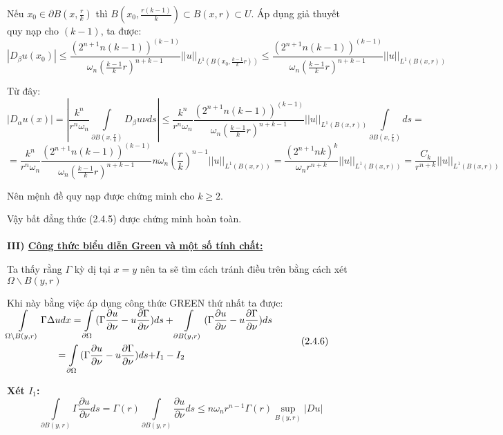 Nếu $x_0  \in \partial B(x,\frac{r}{k})$ thì $B(x_0 ,\frac{{r(k - 1)}}{k}) \subset B(x,r) \subset U$. Áp dụng giả thuyết quy nạp cho $(k-1)$, ta được:
\[
|D_\beta  u(x_0 )| \le \frac{{(2^{n + 1} n(k - 1))^{(k - 1)} }}{{\omega _n (\frac{{k - 1}}{k}r)^{n + k - 1} }}||u||_{L^1 (B(x_0 ,\frac{{k - 1}}{k}r))}  \le \frac{{(2^{n + 1} n(k - 1))^{(k - 1)} }}{{\omega _n (\frac{{k - 1}}{k}r)^{n + k - 1} }}||u||_{L^1 (B(x,r))} 
\]

Từ đây:
\[
|D_\alpha  u(x)| = |\frac{{k^n }}{{r^n \omega _n }}\int\limits_{\partial B(x,\frac{r}{k})} {D_\beta  u\nu ds} | \le \frac{{k^n }}{{r^n \omega _n }}\frac{{(2^{n + 1} n(k - 1))^{(k - 1)} }}{{\omega _n (\frac{{k - 1}}{k}r)^{n + k - 1} }}||u||_{L^1 (B(x ,r))} \int\limits_{\partial B(x,\frac{r}{k})} {ds}= 
\]
\[
 = \frac{{k^n }}{{r^n \omega _n }}\frac{{(2^{n + 1} n(k - 1))^{(k - 1)} }}{{\omega _n (\frac{{k - 1}}{k}r)^{n + k - 1} }}n\omega _n \left( {\frac{r}{k}} \right)^{n - 1} ||u||_{L^1 (B(x,r))}  = \frac{{(2^{n + 1} nk)^k }}{{\omega _n r^{n + k} }}||u||_{L^1 (B(x,r))}  = \frac{{C_k }}{{r^{n + k} }}||u||_{L^1 (B(x,r))} 
 \]

Nên mệnh đề quy nạp được chứng minh cho $k \geq 2$.

Vậy bất đẳng thức (2.4.5) được chứng minh hoàn toàn.
\\
\\
\textbf{III) \underline{Công thức biểu diễn Green và một số tính chất:}}

Ta thấy rằng $\Gamma$ kỳ dị tại $x=y$ nên ta sẽ tìm cách tránh điều trên bằng cách xét $\Omega \backslash B(y,r)$

Khi này bằng việc áp dụng công thức GREEN thứ nhất ta được:\\
$
\begin{gathered}
  \int\limits_{\Omega \backslash B(y,r)} {\Gamma \Delta udx = \int\limits_{\partial \Omega } {(\Gamma \frac{{\partial u}}
{{\partial \nu }}} }  - u\frac{{\partial \Gamma }}
{{\partial \nu }})ds + \int\limits_{\partial B(y,r)} {(\Gamma \frac{{\partial u}}
{{\partial \nu }}}  - u\frac{{\partial \Gamma }}
{{\partial \nu }})ds \hfill \\
  \quad \quad \quad \quad \;\quad  = \int\limits_{\partial \Omega } {(\Gamma \frac{{\partial u}}
{{\partial \nu }} - u\frac{{\partial \Gamma }}
{{\partial \nu }})ds + } I_1  - I_2 
 \hfill \\ 
\end{gathered} 
\quad \quad \quad  (2.4.6)$

\textbf{Xét $I_1$:}\\
\[
\int\limits_{\partial B(y,r)} {\Gamma \frac{{\partial u}}
{{\partial \nu }}ds = \Gamma (r)\int\limits_{\partial B(y,r)} {\frac{{\partial u}}
{{\partial \nu }}ds \leqslant n\omega _n r^{n - 1} \Gamma (r)\mathop {\sup }\limits_{B(y,r)} } } |Du|
\]

